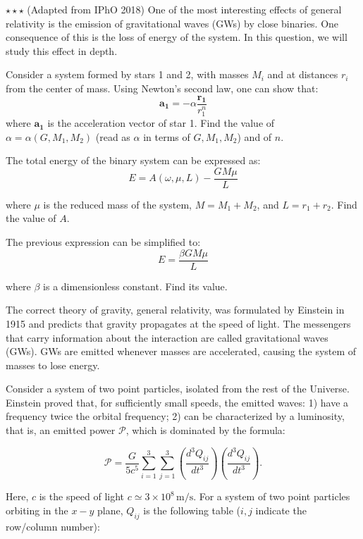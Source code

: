 \documentclass[11pt]{article}
\begin{document}
\begin{pproblem}\(\star\star\star\) (Adapted from IPhO 2018) One of the most interesting effects of general relativity is the emission of gravitational waves (GWs) by close binaries. One consequence of this is the loss of energy of the system. In this question, we will study this effect in depth.

\begin{alternativas}
    \item Consider a system formed by stars 1 and 2, with masses \(M_i\) and at distances \(r_i\) from the center of mass. Using Newton's second law, one can show that:
    \[\mathbf{a_1} = -\alpha \frac{\mathbf{r_1}}{r_1^n}\]
    where \(\mathbf{a_1}\) is the acceleration vector of star 1. Find the value of \(\alpha = \alpha (G, M_1, M_2)\) (read as \(\alpha\) in terms of \(G, M_1, M_2\)) and of \(n\).

    \item The total energy of the binary system can be expressed as:
    \[E = A(\omega, \mu, L) - \frac{GM\mu}{L}\]

    where \(\mu\) is the reduced mass of the system, \(M = M_1+M_2\), and \(L = r_1+r_2\). Find the value of \(A\).

    \item The previous expression can be simplified to:
    \[E = \frac{\beta GM\mu}{L}\]

    where \(\beta\) is a dimensionless constant. Find its value.

    The correct theory of gravity, general relativity, was formulated by Einstein in 1915 and predicts that gravity propagates at the speed of light. The messengers that carry information about the interaction are called gravitational waves (GWs). GWs are emitted whenever masses are accelerated, causing the system of masses to lose energy.

    Consider a system of two point particles, isolated from the rest of the Universe. Einstein proved that, for sufficiently small speeds, the emitted waves: 1) have a frequency twice the orbital frequency; 2) can be characterized by a luminosity, that is, an emitted power \(\mathcal{P}\), which is dominated by the formula:

    \[
    \mathcal{P} = \frac{G}{5c^5} \sum_{i=1}^3 \sum_{j=1}^3 \left( \frac{d^3 Q_{ij}}{dt^3} \right) \left( \frac{d^3 Q_{ij}}{dt^3} \right).
    \]

    Here, \( c \) is the speed of light \( c \simeq 3 \times 10^8 \, \mathrm{m/s} \). For a system of two point particles orbiting in the \( x-y \) plane, \( Q_{ij} \) is the following table (\( i, j \) indicate the row/column number):


\end{alternativas}
\end{pproblem}
\end{document}
